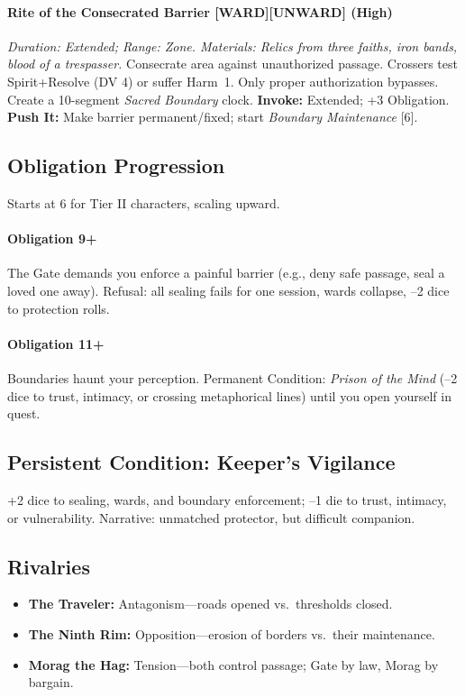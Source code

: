 \paragraph{Rite of the Consecrated Barrier [WARD][UNWARD] (High)}%
\emph{Duration: Extended; Range: Zone. Materials: Relics from three faiths, iron bands, blood of a trespasser.}  
Consecrate area against unauthorized passage. Crossers test Spirit+Resolve (DV 4) or suffer Harm~1. Only proper authorization bypasses. Create a 10-segment \emph{Sacred Boundary} clock.  
\textbf{Invoke:} Extended; +3 Obligation.  
\textbf{Push It:} Make barrier permanent/fixed; start \emph{Boundary Maintenance} [6].

\subsection*{Obligation Progression}
Starts at 6 for Tier II characters, scaling upward.

\paragraph{Obligation 9+} The Gate demands you enforce a painful barrier (e.g., deny safe passage, seal a loved one away). Refusal: all sealing fails for one session, wards collapse, --2 dice to protection rolls.  

\paragraph{Obligation 11+} Boundaries haunt your perception. Permanent Condition: \emph{Prison of the Mind} (--2 dice to trust, intimacy, or crossing metaphorical lines) until you open yourself in quest.

\subsection*{Persistent Condition: Keeper’s Vigilance}
+2 dice to sealing, wards, and boundary enforcement; --1 die to trust, intimacy, or vulnerability. Narrative: unmatched protector, but difficult companion.

\subsection*{Rivalries}
\begin{itemize}
\item \textbf{The Traveler:} Antagonism---roads opened vs.\ thresholds closed.  
\item \textbf{The Ninth Rim:} Opposition---erosion of borders vs.\ their maintenance.  
\item \textbf{Morag the Hag:} Tension---both control passage; Gate by law, Morag by bargain.  
\end{itemize}


